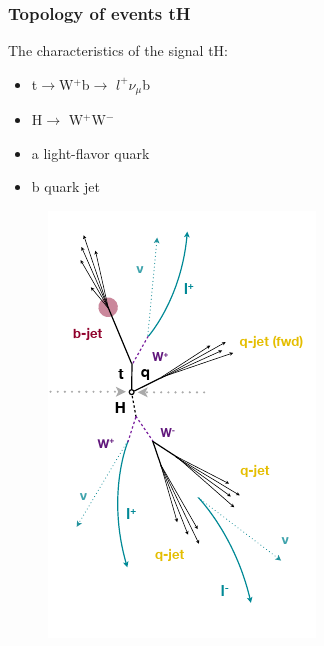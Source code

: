 \documentclass[11pt]{beamer}
\begin{document}
\begin{frame}
\frametitle{Topology of events tH}
The characteristics of the signal tH:

\begin{multicols}{2}
\tiny{
\begin{itemize}
\item t$\rightarrow$W$^+$b$\rightarrow$ $l^+ \nu_\mu$b
\item H$\rightarrow$ W$^+$W$^-$ 

\item a light-flavor quark 
\item  b quark jet  \cite{2}
\end{itemize}
}
\columnbreak
\begin{figure}
	\centering
	\includegraphics[scale=0.5]{figures/jet.png}
\end{figure}
\end{multicols}
\end{frame}
\end{document}
